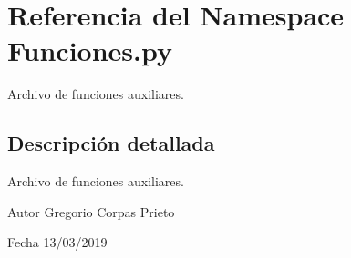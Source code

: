 \hypertarget{namespaceFunciones_1_1py}{}\section{Referencia del Namespace Funciones.\+py}
\label{namespaceFunciones_1_1py}


Archivo de funciones auxiliares.  




\subsection{Descripción detallada}
Archivo de funciones auxiliares. 

\begin{DoxyAuthor}{Autor}
Gregorio Corpas Prieto 
\end{DoxyAuthor}
\begin{DoxyDate}{Fecha}
13/03/2019 
\end{DoxyDate}
